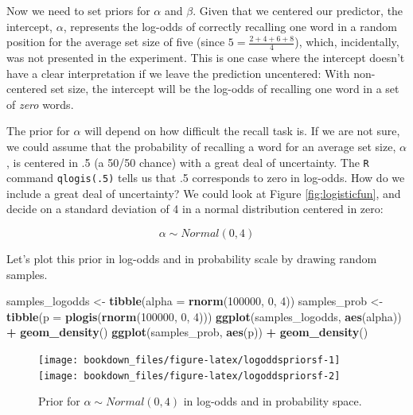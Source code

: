 \documentclass[12pt,]{krantz}
\newenvironment{Shaded}{\begin{snugshade}}{\end{snugshade}}
\newcommand{\DataTypeTok}[1]{\textcolor[rgb]{0.13,0.29,0.53}{#1}}
\newcommand{\DecValTok}[1]{\textcolor[rgb]{0.00,0.00,0.81}{#1}}
\newcommand{\KeywordTok}[1]{\textcolor[rgb]{0.13,0.29,0.53}{\textbf{#1}}}
\newcommand{\NormalTok}[1]{#1}
\newcommand{\OperatorTok}[1]{\textcolor[rgb]{0.81,0.36,0.00}{\textbf{#1}}}
\newcommand{\StringTok}[1]{\textcolor[rgb]{0.31,0.60,0.02}{#1}}
\theoremstyle{definition}
\theoremstyle{definition}
\theoremstyle{definition}
\theoremstyle{remark}
\begin{document}
Now we need to set priors for \(\alpha\) and \(\beta\).
Given that we centered our predictor, the intercept, \(\alpha\), represents the log-odds of correctly recalling one word in a random position for the average set size of five (since \(5 = \frac{2+4+6+8}{4}\)), which, incidentally, was not presented in the experiment. This is one case where the intercept doesn't have a clear interpretation if we leave the prediction uncentered: With non-centered set size, the intercept will be the log-odds of recalling one word in a set of \emph{zero} words.

The prior for \(\alpha\) will depend on how difficult the recall task is. If we are not sure, we could assume that the probability of recalling a word for an average set size, \(\alpha\), is centered in .5 (a 50/50 chance) with a great deal of uncertainty. The \texttt{R} command \texttt{qlogis(.5)} tells us that .5 corresponds to zero in log-odds. How do we include a great deal of uncertainty? We could look at Figure \ref{fig:logisticfun}, and decide on a standard deviation of 4 in a normal distribution centered in zero:

\begin{equation}
\alpha \sim Normal(0, 4) 
\end{equation}

Let's plot this prior in log-odds and in probability scale by drawing random samples.



\begin{Shaded}
\begin{Highlighting}[]
\NormalTok{samples_logodds <-}\StringTok{ }\KeywordTok{tibble}\NormalTok{(}\DataTypeTok{alpha =} \KeywordTok{rnorm}\NormalTok{(}\DecValTok{100000}\NormalTok{, }\DecValTok{0}\NormalTok{, }\DecValTok{4}\NormalTok{))}
\NormalTok{samples_prob <-}\StringTok{ }\KeywordTok{tibble}\NormalTok{(}\DataTypeTok{p =} \KeywordTok{plogis}\NormalTok{(}\KeywordTok{rnorm}\NormalTok{(}\DecValTok{100000}\NormalTok{, }\DecValTok{0}\NormalTok{, }\DecValTok{4}\NormalTok{)))}
\KeywordTok{ggplot}\NormalTok{(samples_logodds, }\KeywordTok{aes}\NormalTok{(alpha)) }\OperatorTok{+}
\StringTok{    }\KeywordTok{geom_density}\NormalTok{()}
\KeywordTok{ggplot}\NormalTok{(samples_prob, }\KeywordTok{aes}\NormalTok{(p)) }\OperatorTok{+}
\StringTok{    }\KeywordTok{geom_density}\NormalTok{()}
\end{Highlighting}
\end{Shaded}

\begin{figure}
\texttt{[image: bookdown\_files/figure-latex/logoddspriorsf-1]} \texttt{[image: bookdown\_files/figure-latex/logoddspriorsf-2]} \caption{Prior for \(\alpha \sim Normal(0, 4)\) in log-odds and in probability space.}\label{fig:logoddspriorsf}
\end{figure}
\end{document}
